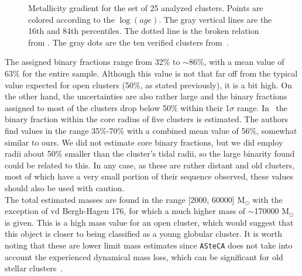 \documentclass{aa}
\begin{document}
  \begin{figure}
   \caption{Metallicity gradient for the set of 25 analyzed clusters.
   Points are colored according to the $\log(age)$. The gray vertical lines are the
   16th and 84th percentiles. The dotted line is the broken relation from 
   \citet[][Fig 7]{Donor_2020}. The gray dots are the ten verified clusters
   from~\cite{Perren_2020}.}
   \label{fig:met_gradient}
  \end{figure}

  The assigned binary fractions range from 32\%  to $\sim86$\%, 
  with a mean value of 63\% for the entire sample. Although this value
  is not that far off from the typical value expected for open clusters (50\%,
  as stated previously), it is a bit high. On the other hand, the
  uncertainties are also rather large and the binary fractions assigned to
  most of the clusters drop below 50\% within their 1$\sigma$ range.
  In~\cite{Sollima_2010} the binary fraction within the core radius of five
  clusters is estimated. The authors find values in the range 35\%-70\% with a
  combined mean value of 56\%, somewhat similar to ours. We did not estimate
  core binary fractions, but we did employ radii about 50\% smaller than the
  cluster's tidal radii, so the large binarity found could be related to this.
  In any case, as these are rather distant and old clusters, most of which have
  a very small portion of their sequence observed, these values should also be
  used with caution.\\

  The total estimated masses are found in the range [2000, 60000] M$_{\odot}$
  with the exception of vd Bergh-Hagen 176, for which a much
  higher mass of $\sim$170000 M$_{\odot}$ is given. This is a high mass
  value for an open cluster, which would suggest that this object is closer to
  being classified as a young globular cluster.
  It is worth noting that these are lower limit mass
  estimates since \texttt{ASteCA} does not take into account the
  experienced dynamical mass loss, which can be significant for old stellar
  clusters~\citep{Martinez_2017}.\\
\end{document}
